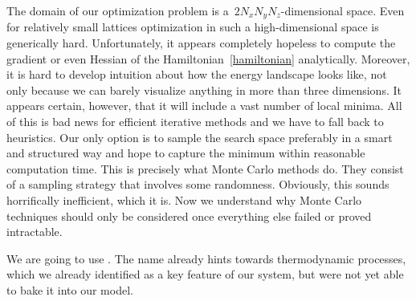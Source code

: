 The domain of our optimization problem is a~$2 N_x N_y N_z$-dimensional space.
Even for relatively small lattices optimization in such a high-dimensional space
is generically hard. Unfortunately, it appears completely hopeless to compute
the gradient or even Hessian of the Hamiltonian~\eqref{hamiltonian}
analytically. Moreover, it is hard to develop intuition about how the energy
landscape looks like, not only because we can barely visualize anything in more
than three dimensions. It appears certain, however, that it will include a vast
number of local minima. All of this is bad news for efficient iterative methods
and we have to fall back to heuristics. Our only option is to sample the search
space preferably in a smart and structured way and hope to capture the minimum
within reasonable computation time. This is precisely what Monte Carlo methods
do. They consist of a sampling strategy that involves some randomness.
Obviously, this sounds horrifically inefficient, which it is. Now we understand
why Monte Carlo techniques should only be considered once everything else failed
or proved intractable.

We are going to use . The name already hints
towards thermodynamic processes, which we already identified as a key feature of
our system, but were not yet able to bake it into our model. 

